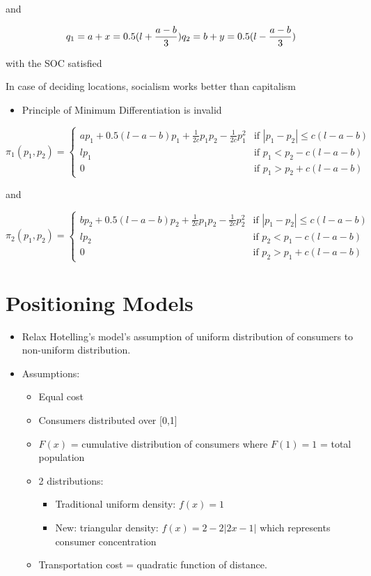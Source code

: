 \documentclass[
]{book}
\providecommand{\tightlist}{%
  \setlength{\itemsep}{0pt}\setlength{\parskip}{0pt}}
\begin{document}
and

\[
q_1 = a + x = 0.5 (l + \frac{a -b}{3}) \\
q_2 = b + y = 0.5 (l - \frac{a-b}{3})
\]

with the SOC satisfied

In case of deciding locations, socialism works better than capitalism

\citep{daspremont1979}

\begin{itemize}
\tightlist
\item
  Principle of Minimum Differentiation is invalid
\end{itemize}

\[
\pi_1 (p_1, p_2) = 
\begin{cases}
ap_1 + 0.5(l-a-b) p_1 + \frac{1}{2c}p_1 p_2 - \frac{1}{2c}p_1^2 & \text{if } |p_1 - p_2| \le c(l-a-b) \\
lp_1 & \text{if } p_1 < p_2 - c(l-a-b) \\
0 & \text{if } p_1 > p_2 + c(l-a-b)
\end{cases}
\]

and

\[
\pi_2 (p_1, p_2) = 
\begin{cases}
bp_2 + 0.5(l-a-b) p_2 + \frac{1}{2c}p_1 p_2  - \frac{1}{2c}p_2^2& \text{if } |p_1 - p_2| \le c(l-a-b) \\
lp_2 & \text{if } p_2 < p_1 - c(l-a-b) \\
0 & \text{if } p_2 > p_1 + c(l-a-b)
\end{cases}
\]

\hypertarget{positioning-models}{%
\section{Positioning Models}\label{positioning-models}}

\citet{tabuchi1995}

\begin{itemize}
\item
  Relax Hotelling's model's assumption of uniform distribution of consumers to non-uniform distribution.
\item
  Assumptions:

  \begin{itemize}
  \item
    Equal cost
  \item
    Consumers distributed over {[}0,1{]}
  \item
    \(F(x)\) = cumulative distribution of consumers where \(F(1) = 1\) = total population
  \item
    2 distributions:

    \begin{itemize}
    \item
      Traditional uniform density: \(f(x) =1\)
    \item
      New: triangular density: \(f(x) = 2 - 2|2x-1|\) which represents consumer concentration
    \end{itemize}
  \item
    Transportation cost = quadratic function of distance.
  \end{itemize}
\end{itemize}
\end{document}
